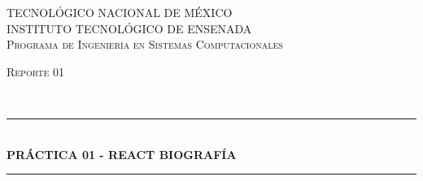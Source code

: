\documentclass[10pt]{article}
\begin{document}
\begin{center}																		%
\newcommand{\HRule}{\rule{\linewidth}{0.5mm}}									%
\begin{minipage}{0.48\textwidth} \begin{flushleft}
\end{flushleft}\end{minipage}
\begin{minipage}{0.48\textwidth} \begin{flushright}
\end{flushright}\end{minipage}

\vspace*{1.0cm}								%
\textsc{\LARGE TECNOLÓGICO NACIONAL DE MÉXICO \\ \vspace{5px} INSTITUTO TECNOLÓGICO DE ENSENADA}\\[2cm]	

\textsc{\LARGE Programa de Ingeniería en Sistemas Computacionales}\\[1.5cm]													%

\begin{minipage}{0.9\textwidth} 
\begin{center}																					%
\textsc{\LARGE Reporte 01}
\end{center}
\end{minipage}\\[0.5cm]
 			\vspace*{1cm}																		%
\HRule \\[0.4cm]																	%
{ \huge \bfseries PRÁCTICA 01 - REACT BIOGRAFÍA}\\[0.4cm]	%
\HRule \\[1.5cm]																	%
\begin{minipage}{0.46\textwidth}													%
\begin{flushleft} \large															%


\end{flushleft}
\end{minipage}
\end{center}
\end{document}
